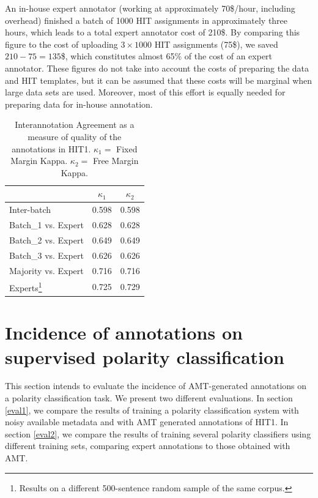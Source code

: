 \documentclass[11pt,letterpaper]{article}
\begin{document}
An in-house expert annotator (working at approximately 70\$/hour, including overhead) finished a batch of 1000 HIT assignments in approximately three hours, which leads to a total expert annotator cost of 210\$. By comparing this figure to the cost of uploading $3 \times 1000$ HIT assignments (75\$), we saved $210 - 75 = 135$\$, which constitutes almost 65\% of the cost of an expert annotator. These figures do not take into account the costs of preparing the data and HIT templates, but it can be assumed that these costs will be marginal when large data sets are used. Moreover, most of this effort is equally needed for preparing data for in-house annotation.

\begin{table}[h]
\begin{center}
\begin{tabular}{|l|c|c|}
\hline
& $\kappa_{1}$ & $\kappa_{2}$ \\ 
\hline
Inter-batch & 0.598 & 0.598 \\ \hline
Batch\_1 vs. Expert & 0.628 & 0.628\\
Batch\_2 vs. Expert & 0.649 & 0.649\\
Batch\_3 vs. Expert & 0.626 & 0.626\\ \hline
Majority vs. Expert & 0.716 & 0.716\\ \hline
Experts\footnote{Results on a different 500-sentence random sample of the same corpus.} & 0.725 & 0.729\\ \hline
\end{tabular}
\end{center}
\label{table.ita}
\caption{Interannotation Agreement as a measure of quality of the annotations in HIT1. $\kappa_{1} = $ Fixed Margin Kappa. $\kappa_{2} = $ Free Margin Kappa.}
\end{table}

\section{Incidence of annotations on supervised polarity classification}
\label{sect:classifier}

This section intends to evaluate the incidence of AMT-generated annotations on a polarity classification task. We present two different evaluations. In section \ref{eval1}, we compare the results of training a polarity classification system with noisy available metadata and with AMT generated annotations of HIT1. In section \ref{eval2}, we compare the results of training several polarity classifiers using different training sets, comparing expert annotations to those obtained with AMT.
\end{document}
